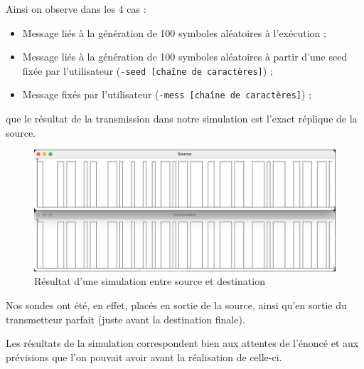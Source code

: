 Ainsi on observe dans les 4 cas :
\begin{itemize}
    \item Message liés à la génération de 100 symboles aléatoires à l'exécution ;
    \item Message liés à la génération de 100 symboles aléatoires à partir d'une seed fixée par l'utilisateur (\texttt{-seed [chaîne de caractères]}) ;
    \item Message fixés par l'utilisateur (\texttt{-mess [chaîne de caractères]}) ;
\end{itemize}

que le résultat de la transmission dans notre simulation est l'exact réplique de la source.

\begin{figure}[H]
    \centering
    \includegraphics[width=\textwidth]{img/source_et_dest.jpg}
    \caption{Résultat d'une simulation entre source et destination}
    \label{fig:simulation1}
\end{figure}

Nos sondes ont été, en effet, placés en sortie de la source, ainsi qu'en sortie du transmetteur parfait (juste avant la destination finale).

Les résultats de la simulation correspondent bien aux attentes de l'énoncé et aux prévisions que l'on pouvait avoir avant la réalisation de celle-ci.



